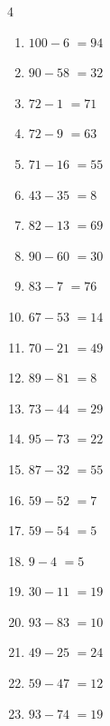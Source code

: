 \begin{multicols}{4}
\begin{enumerate}
  \item $100-6$
        $=94$

  \item $90-58$
        $=32$

  \item $72-1$
        $=71$

  \item $72-9$
        $=63$

  \item $71-16$
        $=55$

  \item $43-35$
        $=8$

  \item $82-13$
        $=69$

  \item $90-60$
        $=30$

\columnbreak %

  \item $83-7$
        $=76$

  \item $67-53$
        $=14$

  \item $70-21$
        $=49$

  \item $89-81$
        $=8$

  \item $73-44$
        $=29$

  \item $95-73$
        $=22$

  \item $87-32$
        $=55$

  \item $59-52$
        $=7$

  \item $59-54$
        $=5$

  \item $9-4$
        $=5$

  \item $30-11$
        $=19$

  \item $93-83$
        $=10$

  \item $49-25$
        $=24$

  \item $59-47$
        $=12$

  \item $93-74$
        $=19$


\end{enumerate}
\end{multicols}
